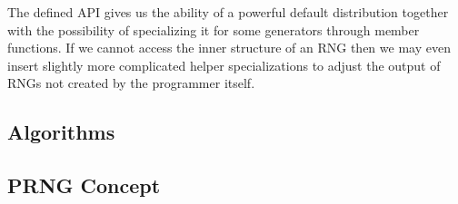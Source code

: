 \documentclass{stdlocal}
\begin{document}
    The defined API gives us the ability of a powerful default distribution together with the possibility of specializing it for some generators through member functions.
    If we cannot access the inner structure of an RNG then we may even insert slightly more complicated helper specializations to adjust the output of RNGs not created by the programmer itself.

  \subsection{Algorithms} %
  \label{sub:algorithms}


  \subsection{PRNG Concept} %
  \label{sub:prng_concept}

\end{document}
